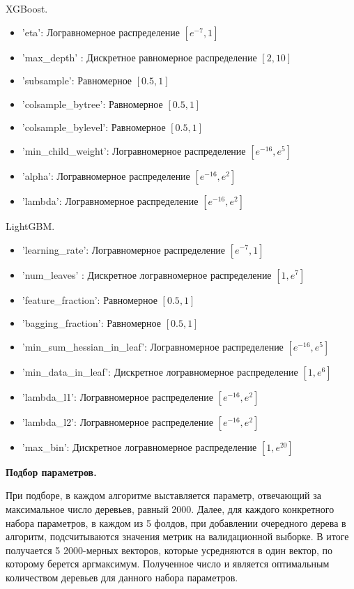 \documentclass{article}
\begin{document}
\medskip
\noindent XGBoost.
\begin{itemize}
  \item 'eta': Логравномерное распределение $[e^{-7}, 1]$
  \item 'max\_depth' : Дискретное равномерное распределение $[2, 10]$
  \item 'subsample': Равномерное $[0.5, 1]$
  \item 'colsample\_bytree': Равномерное $[0.5, 1]$
  \item 'colsample\_bylevel': Равномерное $[0.5, 1]$
  \item 'min\_child\_weight': Логравномерное распределение $[e^{-16}, e^{5}]$
  \item 'alpha': Логравномерное распределение $[e^{-16}, e^{2}]$
  \item 'lambda': Логравномерное распределение $[e^{-16}, e^{2}]$
\end{itemize}

\medskip
\noindent LightGBM.
\begin{itemize}
  \item 'learning\_rate': Логравномерное распределение $[e^{-7}, 1]$
  \item 'num\_leaves' : Дискретное логравномерное распределение $[1, e^{7}]$
  \item 'feature\_fraction': Равномерное $[0.5, 1]$
  \item 'bagging\_fraction': Равномерное $[0.5, 1]$
  \item 'min\_sum\_hessian\_in\_leaf': Логравномерное распределение $[e^{-16}, e^{5}]$
  \item 'min\_data\_in\_leaf':  Дискретное логравномерное распределение $[1, e^{6}]$
  \item 'lambda\_l1': Логравномерное распределение $[e^{-16}, e^{2}]$
  \item 'lambda\_l2': Логравномерное распределение $[e^{-16}, e^{2}]$
  \item 'max\_bin': Дискретное логравномерное распределение $[1, e^{20}]$
\end{itemize}

\medskip
\noindent\textbf{Подбор параметров.}
\medskip

При подборе, в каждом алгоритме выставляется параметр, отвечающий за максимальное число деревьев, равный 2000. Далее, для каждого конкретного набора параметров, в каждом из 5 фолдов, при добавлении очередного дерева в алгоритм, подсчитываются значения метрик на валидационной выборке. В итоге получается 5 2000-мерных векторов, которые усредняются в один вектор, по которому берется аргмаксимум. Полученное число и является оптимальным количеством деревьев для данного набора параметров.
\end{document}
